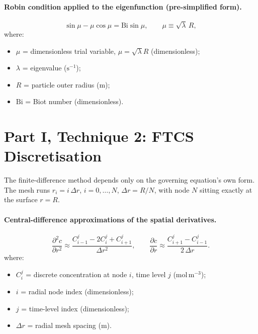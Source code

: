 \documentclass[11pt,a4paper]{article}
\newcommand{\conc}{c}
\newcommand{\Cd}[2]{C_{#1}^{#2}}
\newcommand{\pd}[2]{\frac{\partial #1}{\partial #2}}
\newcommand{\pdd}[2]{\frac{\partial^{2} #1}{\partial #2^{2}}}
\newcommand{\dr}{\Delta r}
\newcommand{\Bi}{\mathrm{Bi}}
\begin{document}
\paragraph{Robin condition applied to the eigenfunction (pre-simplified form).}

\begin{equation}
\sin\mu - \mu\cos\mu = \Bi\sin\mu, \qquad \mu \equiv \sqrt{\lambda}\,R,
\label{eq:b:eigcond-raw}
\end{equation}
\vspace{-0.3em}
\noindent where:

\begin{itemize}[leftmargin=1.6em,itemsep=1pt,topsep=3pt,parsep=0pt]
  \item $\mu$ = dimensionless trial variable, $\mu=\sqrt{\lambda}R$ (dimensionless);
  \item $\lambda$ = eigenvalue ($\mathrm{s^{-1}}$);
  \item $R$ = particle outer radius ($\mathrm{m}$);
  \item $\Bi$ = Biot number (dimensionless).
\end{itemize}



\section{Part I, Technique 2: FTCS Discretisation}
\label{sec:modelb1-ftcs}

The finite-difference method depends only on the governing equation's own
form. The mesh runs $r_i = i\,\dr$, $i=0,\dots,N$, $\dr = R/N$, with node
$N$ sitting exactly at the surface $r=R$.

\paragraph{Central-difference approximations of the spatial derivatives.}

\begin{equation}
  \pdd{\conc}{r} \approx
  \frac{\Cd{i-1}{j} - 2\Cd{i}{j} + \Cd{i+1}{j}}{\dr^{2}},
  \qquad
  \pd{\conc}{r} \approx
  \frac{\Cd{i+1}{j} - \Cd{i-1}{j}}{2\,\dr}.
  \label{eq:central-2nd}
\end{equation}
\vspace{-0.3em}
\noindent where:

\begin{itemize}[leftmargin=1.6em,itemsep=1pt,topsep=3pt,parsep=0pt]
  \item $C_i^{j}$ = discrete concentration at node $i$, time level $j$ ($\mathrm{mol\,m^{-3}}$);
  \item $i$ = radial node index (dimensionless);
  \item $j$ = time-level index (dimensionless);
  \item $\Delta r$ = radial mesh spacing ($\mathrm{m}$).
\end{itemize}
\end{document}
